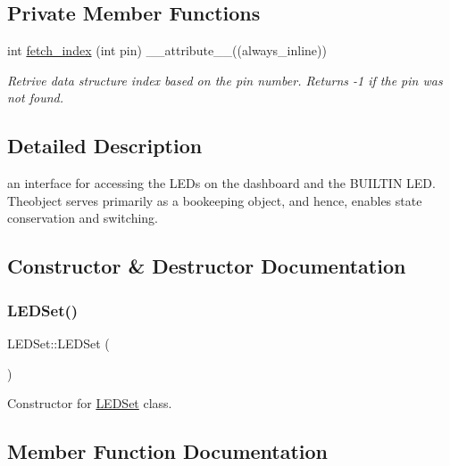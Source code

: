 \subsection*{Private Member Functions}
\begin{DoxyCompactItemize}
\item 
int \hyperlink{classLEDSet_a2ab948b2ac81a4b4e0ace4b51579ad86}{fetch\+\_\+index} (int pin) \+\_\+\+\_\+attribute\+\_\+\+\_\+((always\+\_\+inline))
\begin{DoxyCompactList}\small\item\em Retrive data structure index based on the pin number. Returns -\/1 if the pin was not found. \end{DoxyCompactList}\end{DoxyCompactItemize}


\subsection{Detailed Description}
an interface for accessing the L\+E\+Ds on the dashboard and the B\+U\+I\+L\+T\+IN L\+ED. Theobject serves primarily as a bookeeping object, and hence, enables state conservation and switching. 

\subsection{Constructor \& Destructor Documentation}
\mbox{\label{classLEDSet_a4a65c9b26a11c2e62e65170d1088e201}} 
\subsubsection{\texorpdfstring{L\+E\+D\+Set()}{LEDSet()}}
{\footnotesize\ttfamily L\+E\+D\+Set\+::\+L\+E\+D\+Set (\begin{DoxyParamCaption}{ }\end{DoxyParamCaption})\hspace{0.3cm}{\ttfamily [inline]}}



Constructor for \hyperlink{classLEDSet}{L\+E\+D\+Set} class. 



\subsection{Member Function Documentation}
\mbox{\label{classLEDSet_a70e49efcd898014cb18b973b7f42b0fa}} 
